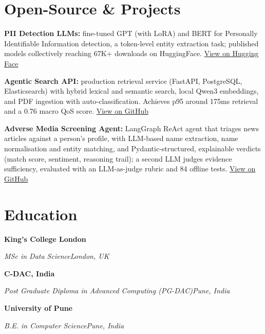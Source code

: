 \documentclass[10pt,a4paper]{article}
\newcommand{\entry}[4]{%
  {\color{company}\bfseries #1}\hfill {\color{muted}#2}\par
  \vspace{1pt}
  {\itshape #3}\hfill {\color{muted}\itshape #4}\par
  \vspace{3pt}%
}
\begin{document}
\section{Open-Source \& Projects}
\begin{tight}
  \item \textbf{PII Detection LLMs:} fine-tuned GPT (with LoRA) and BERT for Personally Identifiable Information detection, a token-level entity extraction task; published models collectively reaching 67K+ downloads on HuggingFace. \href{https://huggingface.co/ab-ai/pii_model}{View on Hugging Face}
  \item \textbf{Agentic Search API:} production retrieval service (FastAPI, PostgreSQL, Elasticsearch) with hybrid lexical and semantic search, local Qwen3 embeddings, and PDF ingestion with auto-classification. Achieves p95 around 175ms retrieval and a 0.76 macro QoS score. \href{https://github.com/abhijeetscode/search-agent}{View on GitHub}
  \item \textbf{Adverse Media Screening Agent:} LangGraph ReAct agent that triages news articles against a person's profile, with LLM-based name extraction, name normalisation and entity matching, and Pydantic-structured, explainable verdicts (match score, sentiment, reasoning trail); a second LLM judges evidence sufficiency, evaluated with an LLM-as-judge rubric and 84 offline tests. \href{https://github.com/abhijeetscode/adverse-media-screening}{View on GitHub}
\end{tight}

\section{Education}
\entry{King's College London}{}{MSc in Data Science}{London, UK}
\vspace{-3pt}
\entry{C-DAC, India}{}{Post Graduate Diploma in Advanced Computing (PG-DAC)}{Pune, India}
\vspace{-3pt}
\entry{University of Pune}{}{B.E. in Computer Science}{Pune, India}
\end{document}

